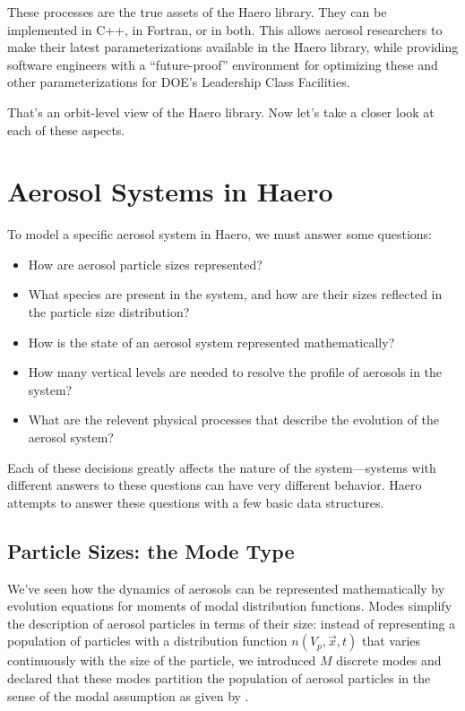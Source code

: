 These processes are the true assets of the Haero library. They can be
implemented in C++, in Fortran, or in both. This allows aerosol researchers to
make their latest parameterizations available in the Haero library, while
providing software engineers with a ``future-proof'' environment for optimizing
these and other parameterizations for DOE's Leadership Class Facilities.

That's an orbit-level view of the Haero library. Now let's take a closer look at
each of these aspects.

\section{Aerosol Systems in Haero}

To model a specific aerosol system in Haero, we must answer some questions:

\begin{itemize}
  \item How are aerosol particle sizes represented?
  \item What species are present in the system, and how are their sizes
        reflected in the particle size distribution?
  \item How is the state of an aerosol system represented mathematically?
  \item How many vertical levels are needed to resolve the profile of aerosols
        in the system?
  \item What are the relevent physical processes that describe the evolution
        of the aerosol system?
\end{itemize}

Each of these decisions greatly affects the nature of the system---systems with
different answers to these questions can have very different behavior. Haero
attempts to answer these questions with a few basic data structures.

\subsection{Particle Sizes: the Mode Type}

We've seen how the dynamics of aerosols can be represented mathematically
by evolution equations for moments of modal distribution functions. Modes
simplify the description of aerosol particles in terms of their size: instead of
representing a population of particles with a distribution function
$n(V_p, \vec{x}, t)$ that varies continuously with the size of the particle, we
introduced $M$ discrete modes and declared that these modes partition the
population of aerosol particles in the sense of the modal assumption as given
by .

